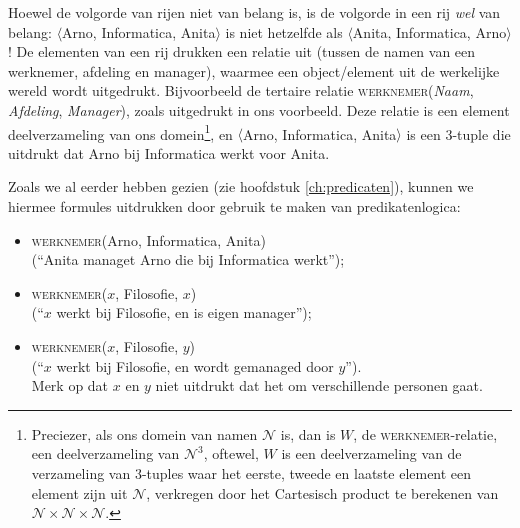 Hoewel de volgorde van rijen niet van belang is, is de volgorde in een rij \textit{wel} van belang: $\langle$Arno, Informatica, Anita$\rangle$ is niet hetzelfde als $\langle$Anita, Informatica, Arno$\rangle$! De elementen van een rij drukken een relatie uit (tussen de namen van een werknemer, afdeling en manager), waarmee een object/element uit de werkelijke wereld wordt uitgedrukt. Bijvoorbeeld de tertaire relatie \textsc{werknemer}(\textit{Naam}, \textit{Afdeling}, \textit{Manager}), zoals uitgedrukt in ons voorbeeld. Deze relatie is een element deelverzameling van ons domein\footnote{Preciezer, als ons domein van namen $\mathcal{N}$ is, dan is $W$, de \textsc{werknemer}-relatie, een deelverzameling van $\mathcal{N}^3$, oftewel, $W$ is een deelverzameling van de verzameling van 3-tuples waar het eerste, tweede en laatste element een element zijn uit $\mathcal{N}$, verkregen door het Cartesisch product te berekenen van $\mathcal{N}\times\mathcal{N}\times\mathcal{N}$.}, en $\langle$Arno, Informatica, Anita$\rangle$ is een 3-tuple die uitdrukt dat Arno bij Informatica werkt voor Anita.

Zoals we al eerder hebben gezien (zie hoofdstuk \ref{ch:predicaten}), kunnen we hiermee formules uitdrukken door gebruik te maken van predikatenlogica:
\begin{itemize}
\item \textsc{werknemer}(Arno, Informatica, Anita)\\(``Anita managet Arno die bij Informatica werkt'');
\item \textsc{werknemer}($x$, Filosofie, $x$)\\(``$x$ werkt bij Filosofie, en is eigen manager'');
\item \textsc{werknemer}($x$, Filosofie, $y$)\\(``$x$ werkt bij Filosofie, en wordt gemanaged door $y$'').\\Merk op dat $x$ en $y$ niet uitdrukt dat het om verschillende personen gaat.
\end{itemize}

